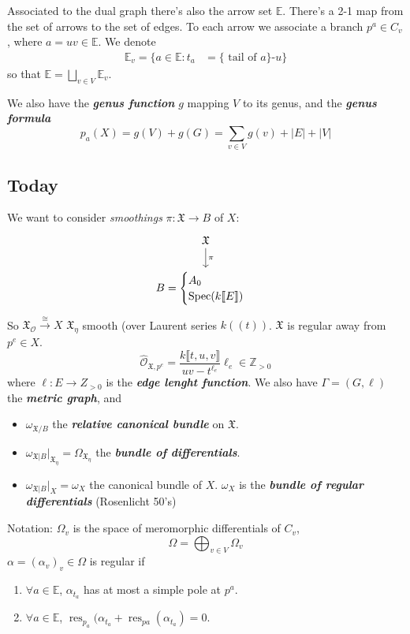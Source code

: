 Associated to the dual graph there's also the arrow set $\mathbb{E}$. There's a 2-1 map from the set of arrows to the set of edges. To each arrow we associate a branch $p^a \in C_v$, where $a=uv\in\mathbb{E}$. We denote
\begin{align*}
	\mathbb{E}_v=\{a\in \mathbb{E}:t_a&=\{\text{ tail of $a$}\}\text{-}u  \}
	\end{align*}
	so that $\mathbb{E}=\bigsqcup_{v \in V}\mathbb{E}_v$.

We also have the \textit{\textbf{genus function}} $g$ mapping $V$ to its genus, and the \textit{\textbf{genus formula}}
 \[p_a(X)=g(V)+g(G)=\sum_{v\in V}g(v)+|E| +|V|\]


 \subsection{Today}
 We want to consider \textit{smoothings}  $\pi:\mathfrak{X} \longrightarrow B$ of $X$:
 \[\begin{tikzcd}
 \mathfrak{X}\arrow[d,"\pi"]\\
 B=\begin{cases}
 	A_0\\
 	\operatorname{Spec}(k\llbracket E\rrbracket)
 \end{cases}
 \end{tikzcd}\]
 So $\mathfrak{X}_\mathcal{O}\xrightarrow{\cong }X$ $\mathfrak{X}_\eta$ smooth (over Laurent series $k(\!(t)\!)$. $\mathfrak{X}$ is regular away from $p^e\in X$.
 \[\hat{\mathcal{O}}_{\mathfrak{X},p^e}=\dfrac{k\llbracket t,u,v\rrbracket}{uv-t^{\ell_e}}\ell_e\in\mathbb{Z}_{>0}\]
 where $\ell:E\longrightarrow Z_{>0}$ is the \textit{\textbf{edge lenght function}}. We also have $\Gamma=(G,\ell)$ the \textit{\textbf{metric graph}}, and
\begin{itemize}
\item $\omega_{\mathfrak{X} /B}$ the \textit{\textbf{relative canonical bundle }}on  $\mathfrak{X}$.
\item $\omega_{\mathfrak{X} |B}|_{\mathfrak{X}_\eta}=\Omega_{\mathfrak{X}_\eta}$ the \textit{\textbf{bundle of differentials}}.
 \item $\omega_{\mathfrak{X} |B}|_{X}=\omega_X$ the canonical bundle of $X$. $\omega_X$ is the \textit{\textbf{bundle of regular differentials}} (Rosenlicht 50's)
\end{itemize}

\begin{thing5}{Notation:}\leavevmode
	 $\Omega_v$ is the space of meromorphic differentials of $C_v$, 
	  \[\Omega=\bigoplus_{v\in V} \Omega_v \]
	  $\alpha=(\alpha_{v})_{v}\in\Omega$ is regular if
	  \begin{enumerate}
	  	\item $\forall a\in\mathbb{E}$, $\alpha_{t_a}$ has at most a simple pole at $p^a$.
		\item $\forall a\in\mathbb{E}$, $\operatorname{res}_{p_a}(\alpha_{t_a}+\operatorname{res}_{pa}(\alpha_{t_a})=0$.
	  \end{enumerate}
\end{thing5}

